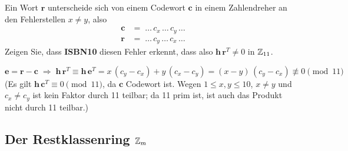 \begin{aufgabe}[Aufgabe 2]
Ein Wort $\mathbf{r}$ unterscheide sich von einem Codewort $\mathbf{c}$ in einem Zahlendreher an
den Fehlerstellen $x \neq y$, also
\begin{align*}
\mathbf{c} &= \;\dots\, c_x \,\dots\, c_y \,\dots\\
\mathbf{r} &= \;\dots\, c_y \,\dots\, c_x \,\dots
\end{align*}
Zeigen Sie, dass \textbf{ISBN10} diesen Fehler erkennt, dass also $\mathbf{h}\,\mathbf{r}^T \neq 0$ in $\mathbb{Z}_{11}$.
\end{aufgabe}
\begin{loesung}
\[
\mathbf{e} = \mathbf{r} - \mathbf{c} \;\Rightarrow\; \mathbf{h}\,\mathbf{r}^T \equiv \mathbf{h}\,\mathbf{e}^T = x\,(c_y - c_x) + y\,(c_x - c_y) = (x - y)\,(c_y - c_x) \not\equiv 0 \pmod{11}
\]
(Es gilt $\mathbf{h}\,\mathbf{c}^T \equiv 0 \pmod{11}$, da $\mathbf{c}$ Codewort ist. Wegen $1 \le x, y \le 10$, $x \neq y$ und $c_x \neq c_y$ ist kein Faktor durch 11 teilbar; da 11 prim ist, ist auch das Produkt nicht durch 11 teilbar.)
\end{loesung}

\subsection{Der Restklassenring $\mathbb{Z}_{m}$}

